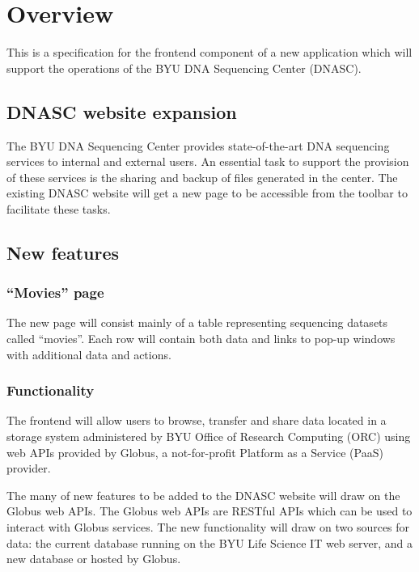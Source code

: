 
\section{Overview}

This is a specification for the frontend component of a new application which will
support the operations of the BYU DNA Sequencing Center (DNASC).

\subsection{DNASC website expansion}

The BYU DNA Sequencing Center provides state-of-the-art DNA sequencing services 
to internal and external users. An essential task to support the provision of these 
services is the sharing and backup of files generated in the center. The existing DNASC 
website  will get a new page to be accessible from the 
toolbar to facilitate these tasks.

\subsection{New features}

\subsubsection{``Movies'' page}
The new page will consist mainly of a table representing sequencing datasets called 
``movies''. Each row will contain both data and links to pop-up windows with additional 
data and actions. 
\subsubsection{Functionality}
The frontend will allow users to browse, transfer and share data 
located in a storage system administered by BYU Office of Research Computing (ORC) using
web APIs provided by Globus, a not-for-profit Platform as a Service (PaaS) provider.

The many of new features to be added to the DNASC website will draw on the Globus web APIs.
The Globus web APIs are RESTful APIs which can be used to interact with Globus services.
The new functionality will draw on two sources for data: the current database running
on the BYU Life Science IT web server, and a new database or  
hosted by Globus.

